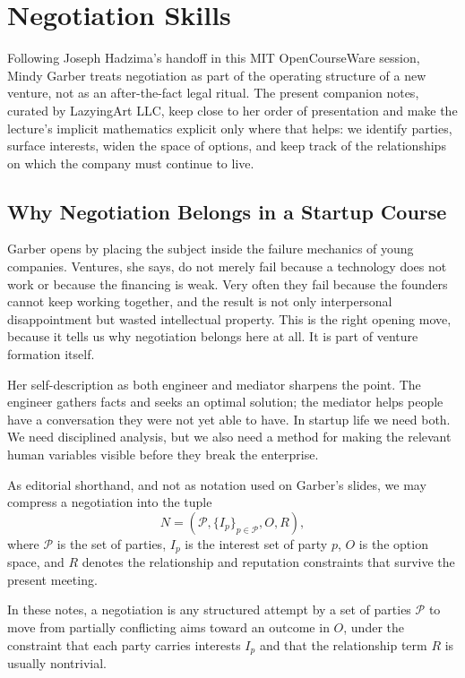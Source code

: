 \chapter{Negotiation Skills}

Following Joseph Hadzima's handoff in this MIT OpenCourseWare session, Mindy Garber treats negotiation as part of the operating structure of a new venture, not as an after-the-fact legal ritual. The present companion notes, curated by LazyingArt LLC, keep close to her order of presentation and make the lecture's implicit mathematics explicit only where that helps: we identify parties, surface interests, widen the space of options, and keep track of the relationships on which the company must continue to live.

\section{Why Negotiation Belongs in a Startup Course}

Garber opens by placing the subject inside the failure mechanics of young companies. Ventures, she says, do not merely fail because a technology does not work or because the financing is weak. Very often they fail because the founders cannot keep working together, and the result is not only interpersonal disappointment but wasted intellectual property. This is the right opening move, because it tells us why negotiation belongs here at all. It is part of venture formation itself.

Her self-description as both engineer and mediator sharpens the point. The engineer gathers facts and seeks an optimal solution; the mediator helps people have a conversation they were not yet able to have. In startup life we need both. We need disciplined analysis, but we also need a method for making the relevant human variables visible before they break the enterprise.

As editorial shorthand, and not as notation used on Garber's slides, we may compress a negotiation into the tuple
\begin{equation}
N = (\mathcal{P}, \{I_p\}_{p\in\mathcal{P}}, O, R),
\end{equation}
where \(\mathcal{P}\) is the set of parties, \(I_p\) is the interest set of party \(p\), \(O\) is the option space, and \(R\) denotes the relationship and reputation constraints that survive the present meeting.

\begin{definition}
In these notes, a negotiation is any structured attempt by a set of parties \(\mathcal{P}\) to move from partially conflicting aims toward an outcome in \(O\), under the constraint that each party carries interests \(I_p\) and that the relationship term \(R\) is usually nontrivial.
\end{definition}

